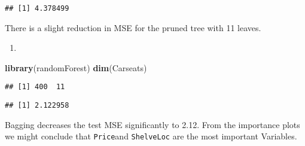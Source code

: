 \documentclass[
]{article}
\newenvironment{Shaded}{\begin{snugshade}}{\end{snugshade}}
\newcommand{\AttributeTok}[1]{\textcolor[rgb]{0.13,0.29,0.53}{#1}}
\newcommand{\ConstantTok}[1]{\textcolor[rgb]{0.56,0.35,0.01}{#1}}
\newcommand{\DecValTok}[1]{\textcolor[rgb]{0.00,0.00,0.81}{#1}}
\newcommand{\FunctionTok}[1]{\textcolor[rgb]{0.13,0.29,0.53}{\textbf{#1}}}
\newcommand{\NormalTok}[1]{#1}
\newcommand{\OtherTok}[1]{\textcolor[rgb]{0.56,0.35,0.01}{#1}}
\newcommand{\SpecialCharTok}[1]{\textcolor[rgb]{0.81,0.36,0.00}{\textbf{#1}}}
\providecommand{\tightlist}{%
  \setlength{\itemsep}{0pt}\setlength{\parskip}{0pt}}
\begin{document}
\begin{verbatim}
## [1] 4.378499
\end{verbatim}

There is a slight reduction in MSE for the pruned tree with 11 leaves.

\begin{enumerate}
\def\labelenumi{\alph{enumi})}
\setcounter{enumi}{3}
\tightlist
\item
\end{enumerate}

\begin{Shaded}
\begin{Highlighting}[]
\FunctionTok{library}\NormalTok{(randomForest)}
\FunctionTok{dim}\NormalTok{(Carseats)}
\end{Highlighting}
\end{Shaded}

\begin{verbatim}
## [1] 400  11
\end{verbatim}

\begin{Shaded}
\end{Shaded}

\begin{verbatim}
## [1] 2.122958
\end{verbatim}

Bagging decreases the test MSE significantly to 2.12. From the
importance plots we might conclude that \texttt{Price}and
\texttt{ShelveLoc} are the most important Variables.
\end{document}
